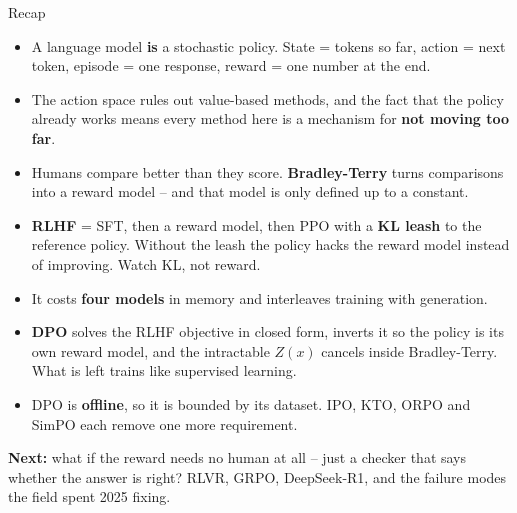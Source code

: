\documentclass[aspectratio=169]{beamer}
\begin{document}
\begin{frame}{Recap}
  \footnotesize
  \begin{itemize}\itemsep4pt
    \item A language model \textbf{is} a stochastic policy. State = tokens so far, action = next
          token, episode = one response, reward = one number at the end.
    \item The action space rules out value-based methods, and the fact that the policy already
          works means every method here is a mechanism for \textbf{not moving too far}.
    \item Humans compare better than they score. \textbf{Bradley-Terry} turns comparisons into a
          reward model -- and that model is only defined up to a constant.
    \item \textbf{RLHF} = SFT, then a reward model, then PPO with a \textbf{KL leash} to the
          reference policy. Without the leash the policy hacks the reward model instead of
          improving. Watch KL, not reward.
    \item It costs \textbf{four models} in memory and interleaves training with generation.
    \item \textbf{DPO} solves the RLHF objective in closed form, inverts it so the policy is its
          own reward model, and the intractable $Z(x)$ cancels inside Bradley-Terry. What is
          left trains like supervised learning.
    \item DPO is \textbf{offline}, so it is bounded by its dataset. IPO, KTO, ORPO and SimPO
          each remove one more requirement.
  \end{itemize}

  \vskip 4pt
  \begin{tcolorbox}[colback=paramgreen!8, colframe=paramgreen, boxrule=0.6pt, arc=2pt]
    \footnotesize
    \textbf{Next:} what if the reward needs no human at all -- just a checker that says whether
    the answer is right? RLVR, GRPO, DeepSeek-R1, and the failure modes the field spent 2025
    fixing.
  \end{tcolorbox}
\end{frame}
\end{document}
